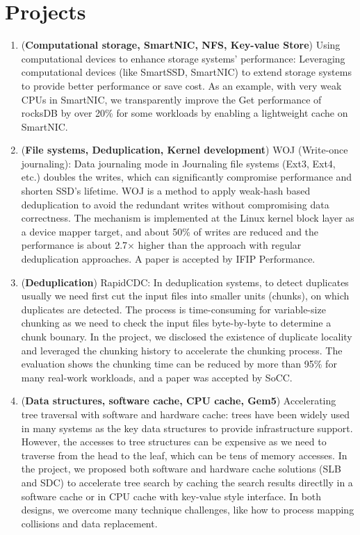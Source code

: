 \documentclass{article}
\begin{document}
\section{Projects}
\begin{enumerate}
\item (\textbf{Computational storage, SmartNIC, NFS, Key-value Store}) Using computational devices to enhance storage systems' performance: Leveraging computational devices (like SmartSSD, SmartNIC) to extend storage systems to provide better performance or save cost. As an example, with very weak CPUs in SmartNIC, we transparently improve the Get performance of rocksDB by over 20\% for some workloads by enabling a lightweight cache on SmartNIC.
\item (\textbf{File systems, Deduplication, Kernel development}) WOJ (Write-once journaling): Data journaling mode in Journaling file systems (Ext3, Ext4, etc.) doubles the writes, which can significantly compromise performance and shorten SSD's lifetime. WOJ is a method to apply weak-hash based deduplication to avoid the redundant writes without compromising data correctness. The mechanism is implemented at the Linux kernel block layer as a device mapper target, and about 50\% of writes are reduced and the performance is about 2.7$\times$ higher than the approach with regular deduplication approaches. A paper is accepted by IFIP Performance. 
\item (\textbf{Deduplication}) RapidCDC:  In deduplication systems, to detect duplicates usually we need first cut the input files into smaller units (chunks), on which duplicates are detected. The process is time-consuming for variable-size chunking as we need to check the input files byte-by-byte to determine a chunk bounary. In the project, we disclosed the existence of duplicate locality and leveraged the chunking history to accelerate the chunking process. The evaluation shows the chunking time can be reduced by more than 95\% for many real-work workloads, and a paper was accepted by SoCC.
\item (\textbf{Data structures, software cache, CPU cache, Gem5}) Accelerating tree traversal with software and hardware cache: trees have been widely used in many systems as the key data structures to provide infrastructure support. However, the accesses to tree structures can be expensive as we need to traverse from the head to the leaf, which can be tens of memory accesses. In the project, we proposed both software and hardware cache solutions (SLB and SDC) to accelerate tree search by caching the search results directlly in a software cache or in CPU cache with key-value style interface. In both designs, we overcome many technique challenges, like how to process mapping collisions and data replacement.

\end{enumerate}
\end{document}
